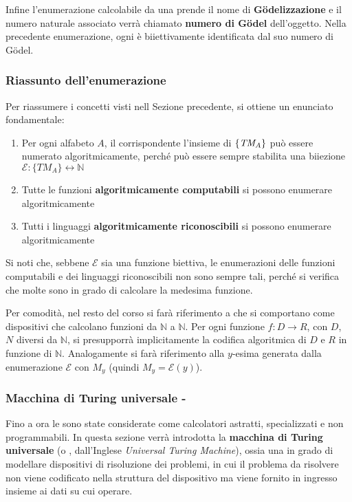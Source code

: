 \documentclass[italian, 10pt]{article}
\begin{document}
\bigskip
Infine l'enumerazione calcolabile da una \TM prende il nome di \textbf{Gödelizzazione} e il numero naturale associato verrà chiamato \textbf{numero di Gödel} dell'oggetto.
Nella precedente enumerazione, ogni \TM è biiettivamente identificata dal suo numero di Gödel.

\subsubsection{Riassunto dell'enumerazione}
\label{sec:riassunto-enumerazione}

Per riassumere i concetti visti nell Sezione precedente, si ottiene un enunciato fondamentale:

\begin{enumerate}
  \item Per ogni alfabeto \(A\), il corrispondente l'insieme di \TM \(\{\textit{TM}_A\}\) può essere numerato algoritmicamente, perché può essere sempre stabilita una biiezione \(\mathscr{E}: \{TM_A\} \leftrightarrow \mathbb{N}\)
  \item Tutte le funzioni \textbf{algoritmicamente computabili} si possono enumerare algoritmicamente
  \item Tutti i linguaggi \textbf{algoritmicamente riconoscibili} si possono enumerare algoritmicamente
\end{enumerate}

Si noti che, sebbene \(\mathscr{E}\) sia una funzione biettiva, le enumerazioni delle funzioni computabili e dei linguaggi riconoscibili non sono sempre tali, perché si verifica che molte \TM sono in grado di calcolare la medesima funzione.

\bigskip
Per comodità, nel resto del corso si farà riferimento a \TM che si comportano come dispositivi che calcolano funzioni da \(\mathbb{N}\) a \(\mathbb{N}\).
Per ogni funzione \(f: D \rightarrow R\), con \(D\), \(N\) diversi da \(\mathbb{N}\), si presupporrà implicitamente la codifica algoritmica di \(D\) e \(R\) in funzione di \(\mathbb{N}\).
Analogamente si farà riferimento alla \(y\)-esima \TM generata dalla enumerazione \(\mathscr{E}\) con \(M_y\) (quindi \(M_y = \mathscr{E}(y)\)).

\subsubsection{Macchina di Turing universale - \UTM}
\label{sec:macchina-turing-universale}

Fino a ora le \TM sono state considerate come calcolatori astratti, specializzati e non programmabili.
In questa sezione verrà introdotta la \textbf{macchina di Turing universale} (o \UTM, dall'Inglese \textit{Universal Turing Machine}), ossia una \TM in grado di modellare dispositivi di risoluzione dei problemi, in cui il problema da risolvere non viene codificato nella struttura del dispositivo ma viene fornito in ingresso insieme ai dati su cui operare.
\end{document}
